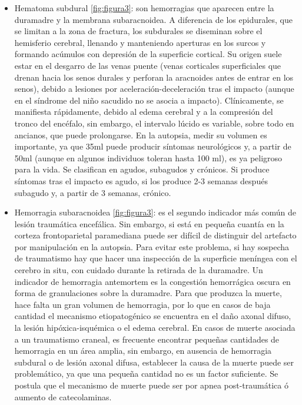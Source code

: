 \begin{itemize}
	\item Hematoma subdural \ref{fig:figura3}: son hemorragias que aparecen entre la duramadre y la membrana subaracnoidea. A diferencia de los epidurales, que se limitan a la zona de fractura, los subdurales se diseminan sobre el hemisferio cerebral, llenando y manteniendo aperturas en los surcos y formando acúmulos con depresión de la superficie cortical. Su origen suele estar en el desgarro de las venas puente (venas corticales superficiales que drenan hacia los senos durales y perforan la aracnoides antes de entrar en los senos), debido a lesiones por aceleración-deceleración tras el impacto (aunque en el síndrome del niño sacudido no se asocia a impacto). Clínicamente, se manifiesta rápidamente, debido al edema cerebral y a la compresión del tronco del encéfalo, sin embargo, el intervalo lúcido es variable, sobre todo en ancianos, que puede prolongarse. En la autopsia, medir su volumen es importante, ya que 35ml puede producir síntomas neurológicos y, a partir de 50ml (aunque en algunos individuos toleran hasta 100 ml), es ya peligroso para la vida. Se clasifican en agudos, subagudos y crónicos. Si produce síntomas tras el impacto es agudo, si los produce 2-3 semanas después subagudo y, a partir de 3 semanas, crónico. 
	\item Hemorragia subaracnoidea \ref{fig:figura3}: es el segundo indicador más común de lesión traumática encefálica. Sin embargo, si está en pequeña cuantía en la corteza frontoparietal paramediana puede ser difícil de distinguir del artefacto por manipulación en la autopsia. Para evitar este problema, si hay sospecha de traumatismo hay que hacer una inspección de la superficie meníngea con el cerebro in situ, con cuidado durante la retirada de la duramadre. Un indicador de hemorragia antemortem es la congestión hemorrágica oscura en forma de granulaciones sobre la duramadre. Para que produzca la muerte, hace falta un gran volumen de hemorragia, por lo que en casos de baja cantidad el mecanismo etiopatogénico se encuentra en el daño axonal difuso, la lesión hipóxica-isquémica o el edema cerebral. En casos de muerte asociada a un traumatismo craneal, es frecuente encontrar pequeñas cantidades de hemorragia en un área amplia, sin embargo, en ausencia de hemorragia subdural o de lesión axonal difusa, establecer la causa de la muerte puede ser problemático, ya que una pequeña cantidad no es un factor suficiente. Se postula que el mecanismo de muerte puede ser por apnea post-traumática ó aumento de catecolaminas. 

\end{itemize}
